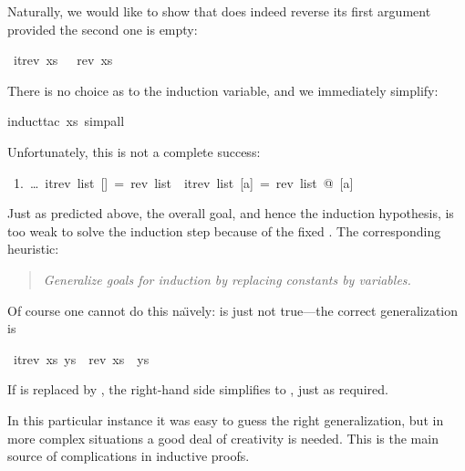 \begin{isabellebody}
\begin{isamarkuptext}
Naturally, we would like to show that  does indeed reverse
its first argument provided the second one is empty:%
\end{isamarkuptext}%
\ {\isachardoublequote}itrev\ xs\ {\isacharbrackleft}{\isacharbrackright}\ {\isacharequal}\ rev\ xs{\isachardoublequote}%
\begin{isamarkuptxt}%
\noindent
There is no choice as to the induction variable, and we immediately simplify:%
\end{isamarkuptxt}%
induct{\isacharunderscore}tac\ xs{\isacharcomma}\ simp{\isacharunderscore}all{\isacharparenright}%
\begin{isamarkuptxt}%
\noindent
Unfortunately, this is not a complete success:
\begin{isabelle}\makeatother
~1.~\dots~itrev~list~[]~=~rev~list~{\isasymLongrightarrow}~itrev~list~[a]~=~rev~list~@~[a]%
\end{isabelle}
Just as predicted above, the overall goal, and hence the induction
hypothesis, is too weak to solve the induction step because of the fixed
\isa{{\isacharbrackleft}{\isacharbrackright}}. The corresponding heuristic:
\begin{quote}
\emph{Generalize goals for induction by replacing constants by variables.}
\end{quote}
Of course one cannot do this na\"{\i}vely:  is
just not true---the correct generalization is%
\end{isamarkuptxt}%
\ {\isachardoublequote}itrev\ xs\ ys\ {\isacharequal}\ rev\ xs\ {\isacharat}\ ys{\isachardoublequote}%
\begin{isamarkuptxt}%
\noindent
If  is replaced by \isa{{\isacharbrackleft}{\isacharbrackright}}, the right-hand side simplifies to
, just as required.

In this particular instance it was easy to guess the right generalization,
but in more complex situations a good deal of creativity is needed. This is
the main source of complications in inductive proofs.


\end{isamarkuptxt}
\end{isabellebody}
